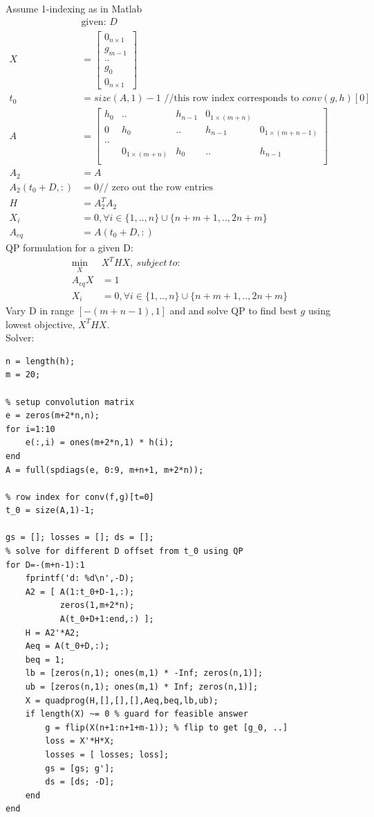 \documentclass[12pt,letter]{article}
\begin{document}
\begin{enumerate}
\begin{itemize}
    Assume 1-indexing as in Matlab
    \begin{align*}
      &\text{given: } D\\
      X &=
      \begin{bmatrix}
        0_{n\times 1}\\ g_{m-1} \\ .. \\ g_{0}\\0_{n \times 1}
      \end{bmatrix}\\
      t_0 &= size(A,1)-1 \text{ //this row index corresponds to } conv(g,h)[0]\\
      A &=
      \begin{bmatrix}
        h_0 & .. & h_{n-1} & 0_{1 \times (m+n)} & \\
        0 & h_0 & .. & h_{n-1} & 0_{1 \times (m+n-1)} \\
        .. & & & &\\
        & 0_{1\times (m+n)} & h_0 & .. & h_{n-1}\\
      \end{bmatrix}\\
      A_2 &= A\\
      A_2(t_0+D,:) &= 0 //\text{ zero out the row entries}\\
      H &= A_2^T A_2\\
      X_i &=0, \forall i \in \{1,..,n\} \cup \{n+m+1,..,2n+m\}\\
      A_{eq}&=A(t_0+D,:)
    \end{align*}
    QP formulation for a given D:
    \begin{align*}
      \min_X & X^T H X,\ subject\ to:\\
      A_{eq}X&=1\\
      X_i &=0, \forall i \in \{1,..,n\} \cup \{n+m+1,..,2n+m\}
    \end{align*}
    Vary D in range $[-(m+n-1),1]$ and and solve QP to find best $g$ using lowest objective, $X^THX$.\\

    \pagebreak
    Solver:
\begin{verbatim}
n = length(h);
m = 20;

% setup convolution matrix
e = zeros(m+2*n,n);
for i=1:10
    e(:,i) = ones(m+2*n,1) * h(i);    
end
A = full(spdiags(e, 0:9, m+n+1, m+2*n));

% row index for conv(f,g)[t=0]
t_0 = size(A,1)-1;

gs = []; losses = []; ds = [];
% solve for different D offset from t_0 using QP
for D=-(m+n-1):1
    fprintf('d: %d\n',-D);
    A2 = [ A(1:t_0+D-1,:);
           zeros(1,m+2*n);
           A(t_0+D+1:end,:) ];
    H = A2'*A2;
    Aeq = A(t_0+D,:);
    beq = 1;
    lb = [zeros(n,1); ones(m,1) * -Inf; zeros(n,1)];
    ub = [zeros(n,1); ones(m,1) * Inf; zeros(n,1)];
    X = quadprog(H,[],[],[],Aeq,beq,lb,ub);
    if length(X) ~= 0 % guard for feasible answer
        g = flip(X(n+1:n+1+m-1)); % flip to get [g_0, ..]
        loss = X'*H*X;
        losses = [ losses; loss];
        gs = [gs; g'];
        ds = [ds; -D];
    end
end


\end{verbatim}
\end{itemize}
\end{enumerate}
\end{document}
